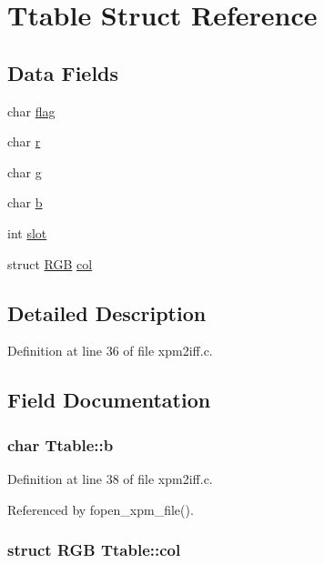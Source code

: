 \hypertarget{structTtable}{\section{Ttable Struct Reference}
\label{structTtable}
}
\subsection*{Data Fields}
\begin{DoxyCompactItemize}
\item 
char \hyperlink{structTtable_ada8267088c0519d324397d9535813595}{flag}
\item 
char \hyperlink{structTtable_a0b8822f1f2ff03ca76464d9f181da5d0}{r}
\item 
char \hyperlink{structTtable_a44113f8a7850eff86b7b3039d31205d8}{g}
\item 
char \hyperlink{structTtable_af158a8959c5fd776c26e267f96b38325}{b}
\item 
int \hyperlink{structTtable_ad02a3434456dfb79c9fb5b055e9664b9}{slot}
\item 
struct \hyperlink{structRGB}{R\+G\+B} \hyperlink{structTtable_af8cf3aa9a2e0a40f01ca818ca7f83567}{col}
\end{DoxyCompactItemize}


\subsection{Detailed Description}


Definition at line 36 of file xpm2iff.\+c.



\subsection{Field Documentation}
\hypertarget{structTtable_af158a8959c5fd776c26e267f96b38325}{
\subsubsection[{b}]{\setlength{\rightskip}{0pt plus 5cm}char Ttable\+::b}}\label{structTtable_af158a8959c5fd776c26e267f96b38325}


Definition at line 38 of file xpm2iff.\+c.



Referenced by fopen\+\_\+xpm\+\_\+file().

\hypertarget{structTtable_af8cf3aa9a2e0a40f01ca818ca7f83567}{
\subsubsection[{col}]{\setlength{\rightskip}{0pt plus 5cm}struct {\bf R\+G\+B} Ttable\+::col}}\label{structTtable_af8cf3aa9a2e0a40f01ca818ca7f83567}


